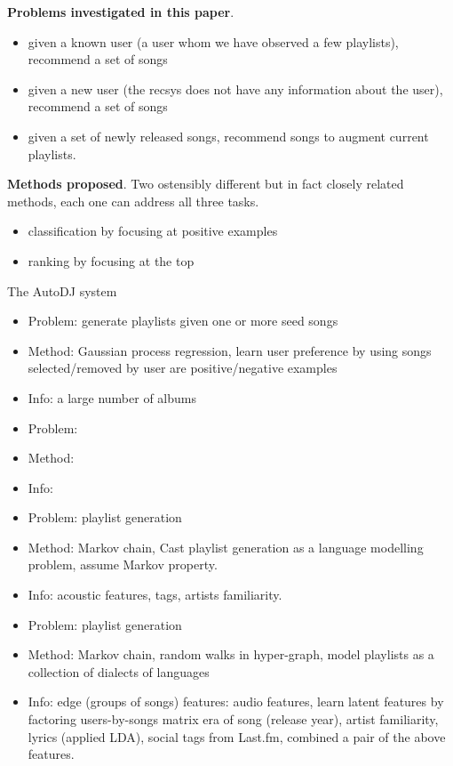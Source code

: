 {\bf Problems investigated in this paper}.
\begin{itemize}
\item given a known user (a user whom we have observed a few playlists), recommend a set of songs
\item given a new user (the recsys does not have any information about the user), recommend a set of songs
\item given a set of newly released songs, recommend songs to augment current playlists.
\end{itemize}

{\bf Methods proposed}.
Two ostensibly different but in fact closely related methods,
each one can address all three tasks.
\begin{itemize}
\item classification by focusing at positive examples
\item ranking by focusing at the top
\end{itemize}



The AutoDJ system~\cite{platt2002learning} 
\begin{itemize}
\item Problem: generate playlists given one or more seed songs
\item Method: Gaussian process regression, learn user preference by using songs selected/removed by user are positive/negative examples
\item Info: a large number of albums
\end{itemize}


\begin{itemize}
\item Problem:
\item Method:
\item Info:
\end{itemize}


\cite{mcfee2011natural}
\begin{itemize}
\item Problem: playlist generation
\item Method: Markov chain, Cast playlist generation as a language modelling problem, assume Markov property.
\item Info: acoustic features, tags, artists familiarity.
\end{itemize}


\cite{mcfee2012hypergraph}
\begin{itemize}
\item Problem: playlist generation 
\item Method: Markov chain, random walks in hyper-graph, model playlists as a collection of dialects of languages
\item Info: edge (\ie groups of songs) features:  audio features, learn latent features by factoring users-by-songs matrix 
era of song (release year), artist familiarity, lyrics (applied LDA), social tags from Last.fm, combined a pair of the above features.
\end{itemize}


